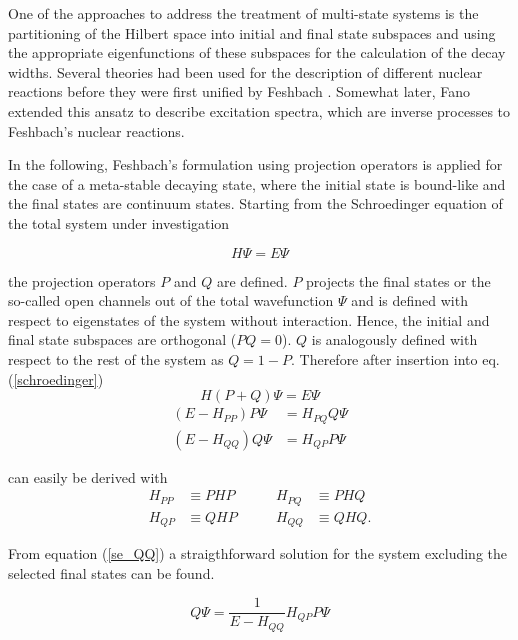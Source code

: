 One of the approaches to address the treatment of multi-state systems is the
partitioning of the Hilbert space into initial and final
state subspaces and using the appropriate eigenfunctions of these subspaces for the
calculation of the decay widths. 
Several theories had been used for the description of different nuclear reactions
before they were first unified by Feshbach \cite{Feshbach58,Feshbach62,Feshbach_book}.
Somewhat later,
Fano extended this ansatz to describe excitation spectra, which
are inverse processes to Feshbach's nuclear reactions.\cite{Fano61}


In the following, Feshbach's formulation using projection
operators is applied for the case of a meta-stable decaying state,
where the initial state
is bound-like and the final states are continuum states.
Starting from the Schroedinger equation of the total system under investigation

\begin{equation}
  H \Psi = E \Psi \label{schroedinger}
\end{equation}

the projection operators $P$ and $Q$ are defined. $P$ projects the final states
or the so-called open channels out
of the total wavefunction $\Psi$ and is defined with respect to eigenstates
of the system without interaction. Hence, the initial and final state subspaces
are orthogonal ($PQ=0$).
$Q$ is analogously defined with respect to the rest of the
system as $Q = 1 - P$. Therefore after insertion into eq. (\ref{schroedinger})
\begin{equation}
  H (P+Q) \Psi = E \Psi
\end{equation}
\begin{align}
  (E - H_{PP}) P \Psi & = H_{PQ} Q \Psi \label{se_PP}\\
  (E - H_{QQ}) Q \Psi & = H_{QP} P \Psi \label{se_QQ}
\end{align}

can easily be derived with
\begin{align*}
  H_{PP} & \equiv PHP & \quad\quad H_{PQ} & \equiv PHQ\\
  H_{QP} & \equiv QHP & \quad\quad H_{QQ} & \equiv QHQ .
\end{align*}

From equation (\ref{se_QQ}) a straigthforward solution for the system excluding
the selected final states can be found.

\begin{equation}
  Q \Psi = \frac{1}{E-H_{QQ}} H_{QP} P \Psi \label{feshbach_qpsi}
\end{equation}


